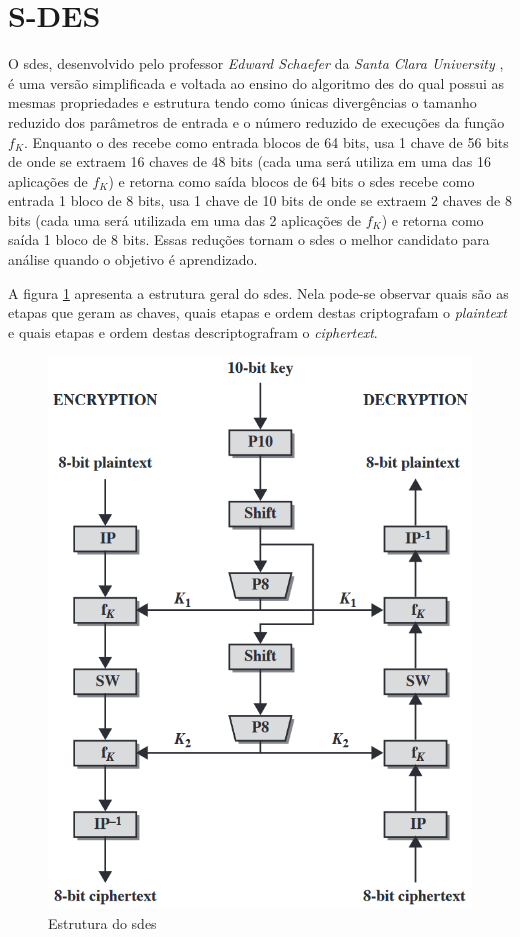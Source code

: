 \section{S-DES}
\label{sec:sdes}
O \acrfull{sdes}, desenvolvido pelo professor \textit{Edward Schaefer} da \textit{Santa Clara University} \cite{schaefer96}, é uma versão simplificada e voltada ao ensino do algoritmo \acrfull{des} do qual possui as mesmas propriedades e estrutura tendo como únicas divergências o tamanho reduzido dos parâmetros de entrada e o número reduzido de execuções da função \(f_K\). Enquanto o \acrshort{des} recebe como entrada blocos de 64 bits, usa 1 chave de 56 bits de onde se extraem 16 chaves de 48 bits (cada uma será utiliza em uma das 16 aplicações de \(f_K\)) e retorna como saída blocos de 64 bits o \acrshort{sdes} recebe como entrada 1 bloco de 8 bits, usa 1 chave de 10 bits de onde se extraem 2 chaves de 8 bits (cada uma será utilizada em uma das 2 aplicações de \(f_K\)) e retorna como saída 1 bloco de 8 bits. Essas reduções tornam o \acrshort{sdes} o melhor candidato para análise quando o objetivo é aprendizado. \cite{stallings10} \cite{stallings14}

A figura \ref{fig:sdesscheme} apresenta a estrutura geral do \acrshort{sdes}. Nela pode-se observar quais são as etapas que geram as chaves, quais etapas e ordem destas criptografam o \textit{plaintext} e quais etapas e ordem destas descriptografram o \textit{ciphertext}.

\begin{figure}[H]
    \centering
    \caption{Estrutura do \acrshort{sdes}}
    \label{fig:sdesscheme}
    \includegraphics[width=.5\linewidth]{Figuras/SDESScheme.png}
\end{figure}

